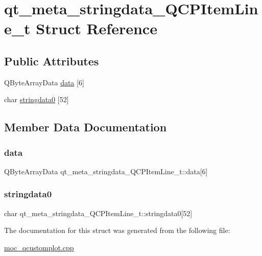 \hypertarget{structqt__meta__stringdata__QCPItemLine__t}{}\section{qt\+\_\+meta\+\_\+stringdata\+\_\+\+Q\+C\+P\+Item\+Line\+\_\+t Struct Reference}
\label{structqt__meta__stringdata__QCPItemLine__t}
\subsection*{Public Attributes}
\begin{DoxyCompactItemize}
\item 
Q\+Byte\+Array\+Data \mbox{\hyperlink{structqt__meta__stringdata__QCPItemLine__t_a4caaf475c8c9a2899091e373fb1c6d49}{data}} \mbox{[}6\mbox{]}
\item 
char \mbox{\hyperlink{structqt__meta__stringdata__QCPItemLine__t_a35c5e2ac8b06d8035260983dc8b9dafa}{stringdata0}} \mbox{[}52\mbox{]}
\end{DoxyCompactItemize}


\subsection{Member Data Documentation}
\mbox{\label{structqt__meta__stringdata__QCPItemLine__t_a4caaf475c8c9a2899091e373fb1c6d49}} 
\subsubsection{\texorpdfstring{data}{data}}
{\footnotesize\ttfamily Q\+Byte\+Array\+Data qt\+\_\+meta\+\_\+stringdata\+\_\+\+Q\+C\+P\+Item\+Line\+\_\+t\+::data\mbox{[}6\mbox{]}}

\mbox{\label{structqt__meta__stringdata__QCPItemLine__t_a35c5e2ac8b06d8035260983dc8b9dafa}} 
\subsubsection{\texorpdfstring{stringdata0}{stringdata0}}
{\footnotesize\ttfamily char qt\+\_\+meta\+\_\+stringdata\+\_\+\+Q\+C\+P\+Item\+Line\+\_\+t\+::stringdata0\mbox{[}52\mbox{]}}



The documentation for this struct was generated from the following file\+:\begin{DoxyCompactItemize}
\item 
\mbox{\hyperlink{moc__qcustomplot_8cpp}{moc\+\_\+qcustomplot.\+cpp}}\end{DoxyCompactItemize}
